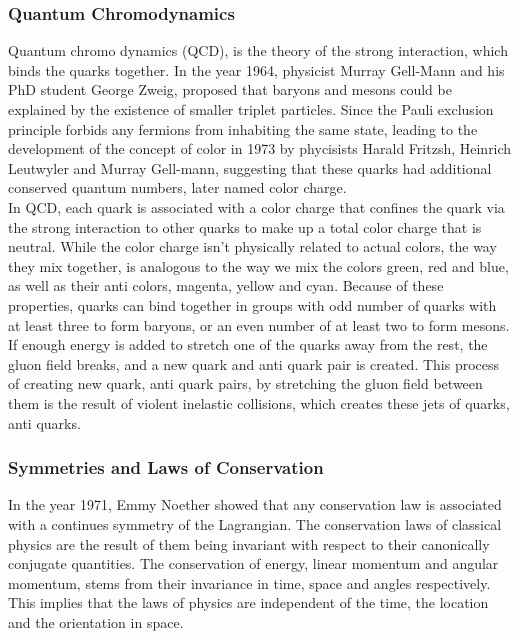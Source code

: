 \documentclass[12pt,a4paper]{article}
\numberwithin{equation}{section}
\begin{document}
\subsubsection{Quantum Chromodynamics}
Quantum chromo dynamics (QCD), is the theory of the strong interaction, which
binds the quarks together. In the year 1964, physicist Murray Gell-Mann and his
PhD student George Zweig, proposed that baryons and mesons could be explained by
the existence of smaller triplet particles\cite{GELLMANN1964214}. Since the
Pauli exclusion principle forbids any fermions from inhabiting the same state,
leading to the development of the concept of color in 1973\cite{FRITZSCH1973365}
by phycisists Harald Fritzsh, Heinrich Leutwyler and Murray Gell-mann,
suggesting that these quarks had additional conserved
quantum numbers, later named color charge.\\

In QCD, each quark is associated with a color charge that confines the quark via
the strong interaction to other quarks to make up a total color charge that is
neutral. While the color charge isn't physically related to actual colors, the
way they mix together, is analogous to the way we mix the colors green, red and
blue, as well as their anti colors, magenta, yellow and cyan. Because of these
properties, quarks can bind together in groups with odd number of quarks with
at least three to form baryons, or an even number of at least two to form mesons.\\

If enough energy is added to stretch one of the quarks away from the rest, the
gluon field breaks, and a new quark and anti quark pair is created. This process
of creating new quark, anti quark pairs, by stretching the gluon field between
them is the result of violent inelastic collisions, which creates these jets of
quarks, anti quarks.\\

\subsubsection{Symmetries and Laws of Conservation}
In the year 1971, Emmy Noether showed that any conservation law is associated
with a continues symmetry of the Lagrangian\cite{Noether_1971}. The
conservation laws of classical physics are the result of them being invariant
with respect to their canonically conjugate quantities. The conservation of
energy, linear momentum and angular momentum, stems from their invariance in
time, space and angles respectively. This implies that the laws of physics are
independent of the time, the location and the orientation in space.\\
\end{document}
